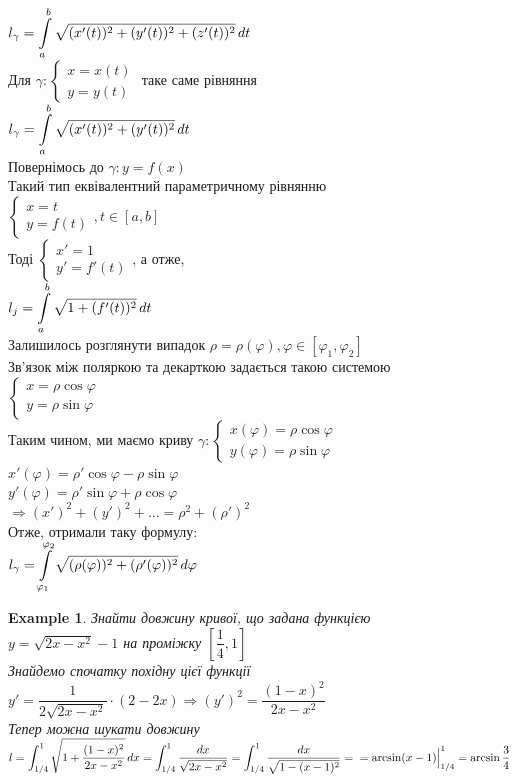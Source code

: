 \documentclass[a4paper, 14pt]{extarticle}
\def\huge{\displaystyle}
\def\bigline{\vspace{5mm}\\}
\theoremstyle{theoremdd}
\theoremstyle{theoremdd}
\theoremstyle{theoremdd}
\theoremstyle{theoremdd}
\newtheorem{example}[theorem]{Example}
\theoremstyle{theoremdd}
\theoremstyle{theoremdd}
\theoremstyle{theoremdd}
\theoremstyle{theoremdd}
\begin{document}
$l_\gamma = \huge \int\displaylimits_a^b \sqrt{(x'(t))^2+(y'(t))^2+(z'(t))^2} \,dt$
\bigline
Для $\gamma: \begin{cases} x = x(t) \\ y = y(t) \end{cases}$ таке саме рівняння\\
$l_\gamma = \huge \int\displaylimits_a^b \sqrt{(x'(t))^2+(y'(t))^2} \,dt$
\bigline
Повернімось до $\gamma: y = f(x)$\\
Такий тип еквівалентний параметричному рівнянню \\ $\begin{cases} x = t \\ y = f(t) \end{cases}, t \in [a,b]$\\
Тоді $\begin{cases} x' = 1 \\ y' = f'(t) \end{cases}$, а отже,\\
$l_j = \huge \int\displaylimits_a^b \sqrt{1+(f'(t))^2}\,dt$
\bigline
Залишилось розглянути випадок $\rho = \rho(\varphi), \varphi \in [\varphi_1,\varphi_2]$\\
Зв'язок між поляркою та декарткою задається такою системою\\
$\begin{cases} x = \rho \cos \varphi \\ y = \rho \sin \varphi \end{cases}$\\
Таким чином, ми маємо криву $\gamma: \begin{cases} x(\varphi) = \rho \cos \varphi \\ y(\varphi) = \rho \sin \varphi \end{cases}$\\
$x'(\varphi) = \rho' \cos \varphi - \rho \sin \varphi$\\
$y'(\varphi) = \rho' \sin \varphi + \rho \cos \varphi$\\
$\Rightarrow (x')^2 + (y')^2 + \dots = \rho^2 + (\rho')^2$\\
Отже, отримали таку формулу:\\
$l_\gamma = \huge\int\displaylimits_{\varphi_1}^{\varphi_2} \sqrt{(\rho(\varphi))^2 + (\rho'(\varphi))^2}\,d\varphi$
\bigline
\begin{example}
Знайти довжину кривої, що задана функцією \\ $y = \sqrt{2x-x^2} -1$ на проміжку $\left[ \dfrac{1}{4},1 \right]$\\
Знайдемо спочатку похідну цієї функції\\
$y' = \dfrac{1}{2 \sqrt{2x-x^2}} \cdot (2-2x) \Rightarrow (y')^2 = \dfrac{(1-x)^2}{2x-x^2}$\\
Тепер можна шукати довжину\\
$l = \huge\int_{1/4}^1 \sqrt{1 + \dfrac{(1-x)^2}{2x-x^2}}\,dx = \int_{1/4}^1 \dfrac{dx}{\sqrt{2x-x^2}} = \int_{1/4}^1 \dfrac{dx}{\sqrt{1-(x-1)^2}} = \\ = \arcsin(x-1) \Big|_{1/4}^1 = \arcsin \dfrac{3}{4}$
\bigline
\end{example}
\end{document}
